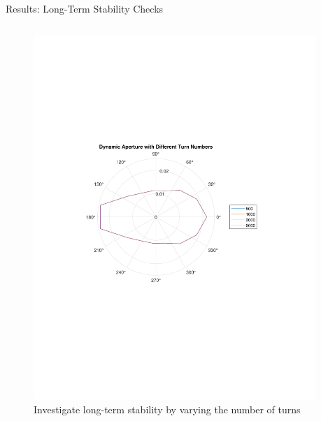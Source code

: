 \documentclass{beamer}
\begin{document}

\begin{frame}{Results: Long-Term Stability Checks}
\begin{columns}
\begin{column}{0.5\textwidth}
 \begin{figure}
    \centering
    \includegraphics[width=1\linewidth]{sc_da_vs_nturn.pdf}
    \caption{Investigate long-term stability by varying the number of turns }
 \end{figure}
\end{column}
\begin{column}{0.5\textwidth}


\end{column}
\end{columns}
\end{frame}
\end{document}
